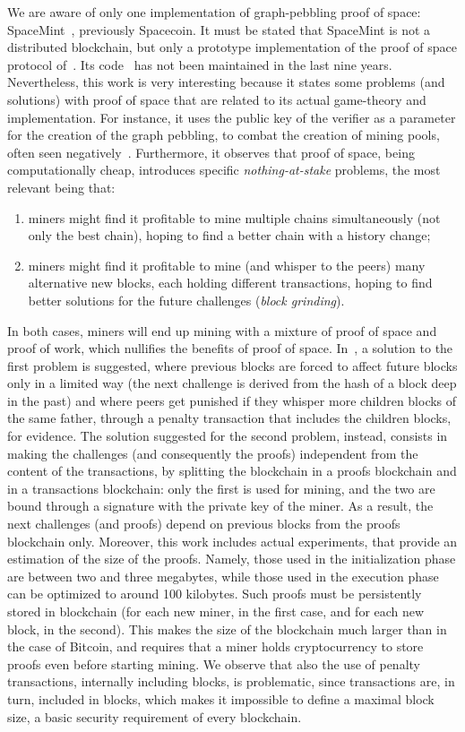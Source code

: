 We are aware of only one implementation of graph-pebbling proof of space:
SpaceMint~\cite{ParkKFGAP18}, previously Spacecoin.
It must be stated that SpaceMint is not a distributed blockchain,
but only a prototype implementation of the proof of space protocol of~\cite{DziembowskiFKP15}.
Its code~\cite{SpaceMintCode} has not been maintained in the last nine years.
Nevertheless, this work is very interesting because it states some problems (and solutions) with proof of space
that are related to its actual game-theory and implementation.
For instance, it uses the public key of the verifier as a parameter for the creation
of the graph pebbling, to combat the creation of mining pools, often seen
negatively~\cite{MillerKKS15}.
Furthermore, it observes that proof of space, being computationally cheap, introduces
specific \emph{nothing-at-stake} problems, the most relevant being that:
%
\begin{enumerate}
\item miners might find it profitable to mine multiple chains simultaneously (not only the best chain),
  hoping to find a better chain with a history change;
\item miners might find it profitable to mine
  (and whisper to the peers) many alternative new blocks, each holding
  different transactions, hoping to find better solutions for the future challenges (\emph{block grinding}).
\end{enumerate}
%
In both cases, miners will end up mining with a mixture of proof of space and proof of work,
which nullifies the benefits of proof of space.
In~\cite{ParkKFGAP18}, a solution to the first problem is suggested, where
previous blocks are forced to affect future blocks only in a limited way
(the next challenge is derived from the hash of a block deep in the past)
and where peers get punished if they
whisper more children blocks of the same father, through a penalty transaction that
includes the children blocks, for evidence.
The solution suggested for the second problem, instead, consists in making the challenges
(and consequently the proofs) independent from the content of the transactions, by splitting the
blockchain in a proofs blockchain and in a transactions blockchain: only the first is used for mining,
and the two are bound through a signature with the private key of the miner.
As a result, the next challenges (and proofs) depend on previous blocks from the proofs blockchain only.
Moreover, this work includes actual experiments, that provide an estimation of the size of the proofs.
Namely, those used in the initialization phase are between two and three megabytes, while those used
in the execution phase can be optimized to around 100 kilobytes. Such proofs must be persistently stored in
blockchain (for each new miner, in the first case, and for each new block, in the second).
This makes the size of the blockchain much larger than in the case of Bitcoin, and requires
that a miner holds cryptocurrency to store proofs even before starting mining.
We observe that also the use of penalty transactions, internally including blocks, is problematic, since
transactions are, in turn, included in blocks, which makes it impossible to define
a maximal block size, a basic security requirement of every blockchain.

